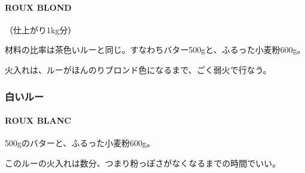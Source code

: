 \begin{recette}
{\paragraph{ROUX BLOND}\label{roux-blond-1}}


（仕上がり1kg分）

材料の比率は茶色いルーと同じ。すなわちバター500gと、ふるった小麦粉600g。

火入れは、ルーがほんのりブロンド色になるまで、ごく弱火で行なう。

\maeaki

\hypertarget{ux767dux3044ux30ebux30fc}{%
\subsubsection{白いルー}\label{ux767dux3044ux30ebux30fc}}

\hypertarget{roux-blanc}{%
\paragraph{ROUX BLANC}\label{roux-blanc}}

 

500gのバターと、ふるった小麦粉600g。

このルーの火入れは数分、つまり粉っぽさがなくなるまでの時間でいい。
\end{recette}